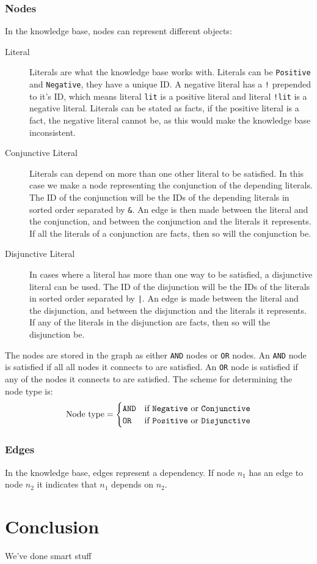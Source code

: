 \documentclass[11pt]{article}
\begin{document}
\subsubsection{Nodes}
In the knowledge base, nodes can represent different objects:
\begin{description}
	\item[Literal] Literals are what the knowledge base works with. Literals can be {\tt Positive} and {\tt Negative}, they have a unique ID. A negative literal has a {\tt !} prepended to it's ID, which means literal {\tt lit} is a positive literal and literal {\tt !lit} is a negative literal. Literals can be stated as facts, if the positive literal is a fact, the negative literal cannot be, as this would make the knowledge base inconsistent.
	
	\item[Conjunctive Literal] Literals can depend on more than one other literal to be satisfied. In this case we make a node representing the conjunction of the depending literals. The ID of the conjunction will be the IDs of the depending literals in sorted order separated by {\tt \&}. An edge is then made between the literal and the conjunction, and between the conjunction and the literals it represents. If all the literals of a conjunction are facts, then so will the conjunction be.
	
	\item[Disjunctive Literal] In cases where a literal has more than one way to be satisfied, a disjunctive literal can be used. The ID of the disjunction will be the IDs of the literals in sorted order separated by {\tt |}. An edge is made between the literal and the disjunction, and between the disjunction and the literals it represents. If any of the literals in the disjunction are facts, then so will the disjunction be.
\end{description}

The nodes are stored in the graph as either {\tt AND} nodes or {\tt OR} nodes. An {\tt AND} node is satisfied if all all nodes it connects to are satisfied. An {\tt OR} node is satisfied if any of the nodes it connects to are satisfied. The scheme for determining the node type is:
$$
\text{Node type} = \begin{cases}
  {\text{\tt AND}} & \text{if {\tt Negative} or {\tt Conjunctive}} \\
  {\text {\tt OR}} & \text{if {\tt Positive} or {\tt Disjunctive}}
\end{cases}
$$

\subsubsection{Edges}
In the knowledge base, edges represent a dependency. If node $n_1$ has an edge to node $n_2$ it indicates that $n_1$ depends on $n_2$.

\section{Conclusion}
We've done smart stuff
\end{document}
